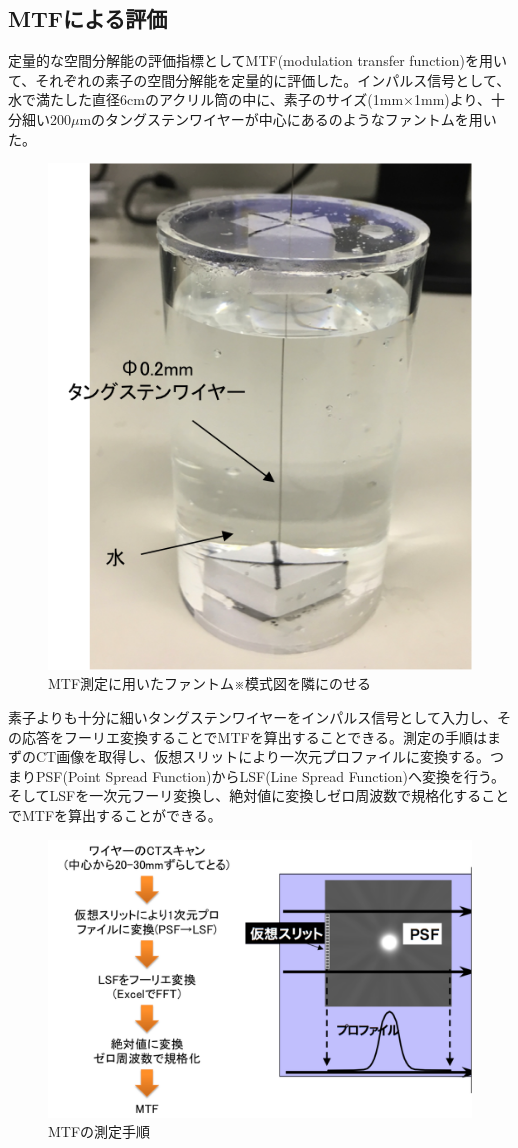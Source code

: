 \subsection{MTFによる評価}
定量的な空間分解能の評価指標としてMTF(modulation transfer function)を用いて、それぞれの素子の空間分解能を定量的に評価した。インパルス信号として、水で満たした直径6cmのアクリル筒の中に、素子のサイズ(1mm$\times$1mm)より、十分細い200$\mu$mのタングステンワイヤーが中心にあるのようなファントムを用いた。

\begin{figure}[H]
 \begin{center}
 \includegraphics[bb=0.000000 0.000000 233.740677 279.336908,width=0.3\hsize]{image2/chapter5/MTF_phantom.png} 
 \end{center}
 \caption{MTF測定に用いたファントム※模式図を隣にのせる}
 \label{fig:MTF_phantom}
\end{figure}

素子よりも十分に細いタングステンワイヤーをインパルス信号として入力し、その応答をフーリエ変換することでMTFを算出することできる。測定の手順はまずのCT画像を取得し、仮想スリットにより一次元プロファイルに変換する。つまりPSF(Point Spread Function)からLSF(Line Spread Function)へ変換を行う。そしてLSFを一次元フーリ変換し、絶対値に変換しゼロ周波数で規格化することでMTFを算出することができる。

\begin{figure}[H]
 \begin{center}
 \includegraphics[bb=0.000000 0.000000 621.548619 408.446235,width=1\hsize]{image2/chapter5/MTF_method.png} 
 \end{center}
 \caption{MTFの測定手順}
 \label{fig:MTF_method}
\end{figure}

